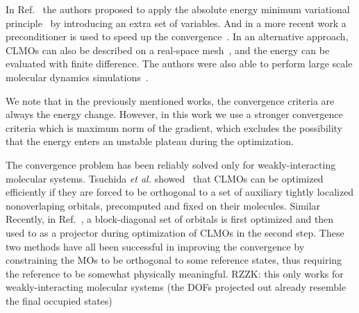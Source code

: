 \documentclass[aps,prl,twocolumn,reprint,amsmath,amssymb]{revtex4-1}
\begin{document}
In Ref.~ the authors proposed to apply the absolute energy minimum variational principle~\cite{yang1997absolute} by introducing an extra set of variables. And in a more recent work a preconditioner is used to speed up the convergence~\cite{peng2013effective}.
In an alternative approach, CLMOs can also be described on a real-space mesh~\cite{fattebert2004linear,fattebert2006linear}, and the energy can be evaluated with finite difference. The authors were also able to perform large scale molecular dynamics simulations~\cite{osei2014accurate}.

We note that in the previously mentioned works, the convergence criteria are always the energy change. However, in this work we use a stronger convergence criteria which is maximum norm of the gradient, which excludes the possibility that the energy enters an unstable plateau during the optimization.


The convergence problem has been reliably solved only for weakly-interacting molecular systems. Tsuchida \emph{et al.} showed~\cite{tsuchida2007augmented,tsuchida2008ab} that CLMOs can be optimized efficiently if they are forced to be orthogonal to  a set of auxiliary tightly localized nonoverlaping orbitals, precomputed and fixed on their molecules. Similar Recently, in Ref.~, a block-diagonal set of orbitals is first optimized and then used to as a projector during optimization of CLMOs in the second step. These two methods have all been successful in improving the convergence by constraining the MOs to be orthogonal to some reference states, thus requiring the reference to be somewhat physically meaningful. RZZK: this only works for weakly-interacting molecular systems (the DOFs projected out already resemble the final occupied states)
\end{document}
